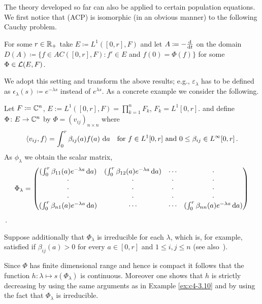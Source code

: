 The theory developed so far can also be applied to certain population equations.
We first notice that (ACP) is isomorphic (in an obvious manner) to the following Cauchy problem.

For some $r \in \mathbb{R}_{+}$ take $E \coloneqq L^{1}([0,r], F)$ and let $A \coloneqq - \frac{\mathop{}\!\mathrm{d}{}}{\mathop{}\!\mathrm{d}{t}}$ on the domain $D(A) \coloneqq \{f \in AC([0,r], F) \colon f' \in E$ and $f(0) = \Phi(f)\}$ for some $\Phi \in \mathcal{L}(E,F)$.

We adopt this setting and transform the above results; e.g., $\varepsilon_{\lambda}$ has to be defined as $\epsilon_{\lambda}(s) \coloneqq e^{-\lambda s}$ instead of $e^{\lambda s}$.
As a concrete example we consider the following.



\begin{example}\label{ex:c4-3.12}
Let $F \coloneqq \mathbb{C}^{n}$, $E:= L^{1}([0,r],F) = \prod_{k=1}^{n} F_{k}$, $F_{k} = L^{1}[0,r]$. and define $\Phi \colon E \to \mathbb{C}^{n}$ by $\Phi = (v_{ij})_{{n\times n}}$ where
\[
\langle v_{ij}, f \rangle = \int_{0}^{r} \beta_{ij}(a)f(a) \, \mathop{}\!\mathrm{d}{a} \quad \text{for } f \in L^{1}[0,r] \text{ and } 0 \leq \beta_{ij} \in L^{\infty}[0,r] \, .
\]
As $\phi_{\lambda}$ we obtain the scalar matrix,
\begin{equation*}\label{eq:c4-3.12-kgk2}
\Phi_{\lambda} = \begin{pmatrix}
(\int_0^r \beta_{11}(a)e^{-\lambda a}\mathop{}\!\mathrm{d}{a}) & (\int_0^r \beta_{12}(a)e^{-\lambda a}\mathop{}\!\mathrm{d}{a}) & \cdots & \cdot \\
\cdot & \cdot & \cdot & \cdot \\
\cdot & \cdot & \cdot & \cdot \\
\cdot & \cdot & \cdot & \cdot \\
(\int_0^r \beta_{n1}(a)e^{-\lambda a}\mathop{}\!\mathrm{d}{a}) & \cdots & \cdots & (\int_0^r \beta_{nn}(a)e^{-\lambda a}\mathop{}\!\mathrm{d}{a})
\end{pmatrix} 
\end{equation*} \,.

Suppose additionally that $\Phi_{\lambda}$ is irreducible for each $\lambda$, which is, for example, satisfied if $\beta_{ij}(a) > 0$ for every $a \in [0,r]$ and $1 \leq i,j \leq n$ (see also \citet[p.257ff]{bellmancooke:1963}\,).

Since $\Phi$ has finite dimensional range and hence is compact it follows that the function $h \colon \lambda \mapsto s(\Phi_{\lambda})$ is continuous.
Moreover one shows that $h$ is strictly decreasing by using the same arguments as in Example \ref{ex:c4-3.10} and by using the fact that $\Phi_{\lambda}$ is irreducible.


\end{example}
